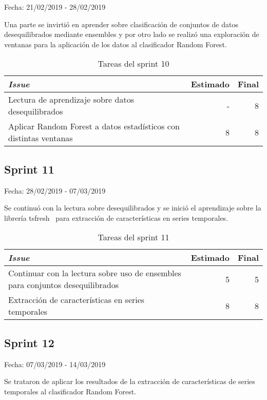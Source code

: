 Fecha: 21/02/2019 - 28/02/2019

Una parte se invirtió en aprender sobre clasificación de conjuntos de datos desequilibrados mediante ensembles y por otro lado se realizó una exploración de ventanas para la aplicación de los datos al clasificador Random Forest. 

\begin{table}[H]
	\begin{tabularx}{\textwidth}{Xrr}
		\toprule \textbf{\textit{Issue}} & \textbf{Estimado} & \textbf{Final}\\
		\toprule 
		Lectura de aprendizaje sobre datos desequilibrados & - & 8 \\
		Aplicar Random Forest a datos estadísticos con distintas ventanas & 8 & 8 \\
		\bottomrule
	\end{tabularx}
	\caption{Tareas del sprint 10}
\end{table}

\subsection{Sprint 11}

Fecha: 28/02/2019 - 07/03/2019

Se continuó con la lectura sobre desequilibrados y se inició el aprendizaje sobre la librería tsfresh~\cite{tsfresh} para extracción de características en series temporales.  

\begin{table}[H]
	\begin{tabularx}{\textwidth}{Xrr}
		\toprule \textbf{\textit{Issue}} & \textbf{Estimado} & \textbf{Final}\\
		\toprule
		Continuar con la lectura sobre uso de ensembles para conjuntos desequilibrados & 5 & 5 \\
		Extracción de características en series temporales & 8 & 8 \\
		\bottomrule
	\end{tabularx}
	\caption{Tareas del sprint 11}
\end{table}

\subsection{Sprint 12}

Fecha: 07/03/2019 - 14/03/2019

Se trataron de aplicar los resultados de la extracción de características de series temporales al clasificador Random Forest. 

